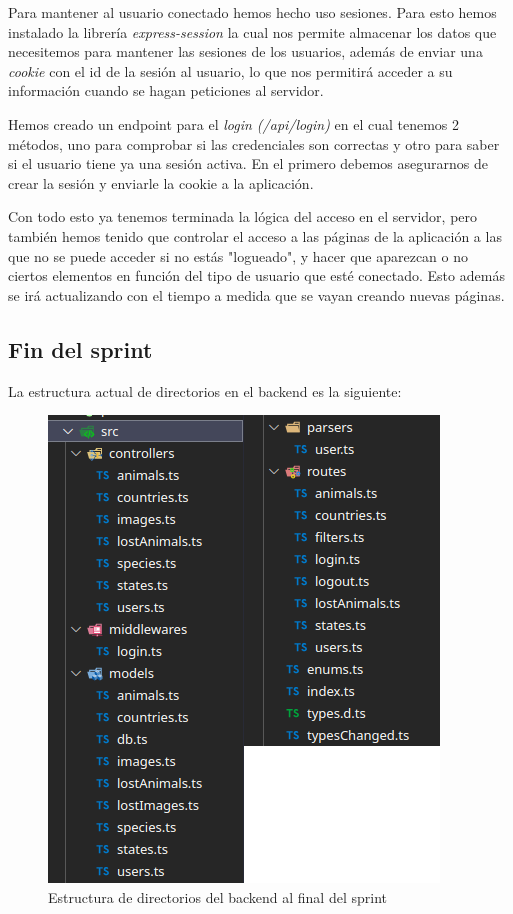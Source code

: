 Para mantener al usuario conectado hemos hecho uso sesiones. Para esto hemos instalado la librería \textit{express-session} la cual nos permite almacenar los datos que necesitemos para mantener las sesiones de los usuarios, además de enviar una \textit{cookie} con el id de la sesión al usuario, lo que nos permitirá acceder a su información cuando se hagan peticiones al servidor.

Hemos creado un endpoint para el \textit{login (/api/login)} en el cual tenemos 2 métodos, uno para comprobar si las credenciales son correctas y otro para saber si el usuario tiene ya una sesión activa. En el primero debemos asegurarnos de crear la sesión y enviarle la cookie a la aplicación.

Con todo esto ya tenemos terminada la lógica del acceso en el servidor, pero también hemos tenido que controlar el acceso a las páginas de la aplicación a las que no se puede acceder si no estás "logueado", y hacer que aparezcan o no ciertos elementos en función del tipo de usuario que esté conectado. Esto además se irá actualizando con el tiempo a medida que se vayan creando nuevas páginas. \\

\subsection{Fin del sprint}

La estructura actual de directorios en el backend es la siguiente: 

\begin{figure}[H]
	\centering
	\includegraphics[width=0.7\linewidth]{"sprint 2/directoriosBackS2"}
	\caption{Estructura de directorios del backend al final del sprint}
	\label{fig:directoriosbacks2}
\end{figure}

